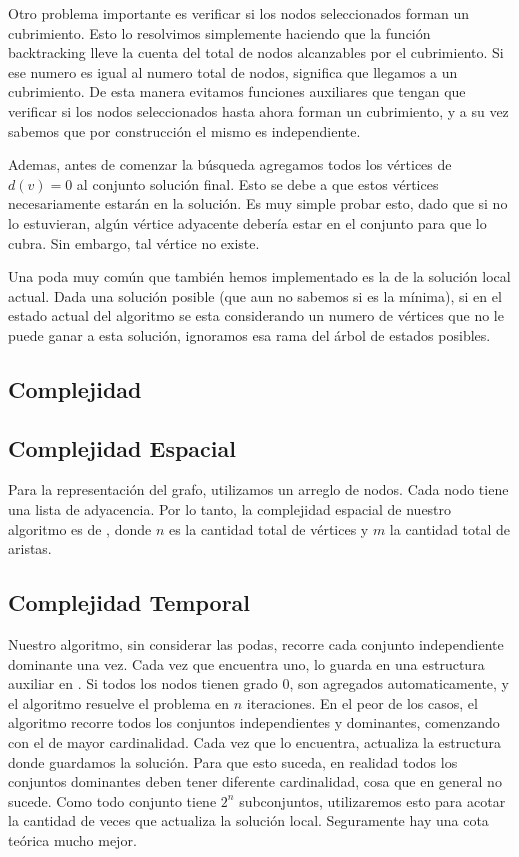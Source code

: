 Otro problema importante es verificar si los nodos seleccionados forman un cubrimiento. Esto lo resolvimos simplemente haciendo que la función backtracking lleve la cuenta del total de nodos alcanzables por el cubrimiento. Si ese numero es igual al numero total de nodos, significa que llegamos a un cubrimiento. De esta manera evitamos funciones auxiliares que tengan que verificar si los nodos seleccionados hasta ahora forman un cubrimiento, y a su vez sabemos que por construcción el mismo es independiente.

Ademas, antes de comenzar la búsqueda agregamos todos los vértices de $d(v) = 0$ al conjunto solución final. Esto se debe a que estos vértices necesariamente estarán en la solución. Es muy simple probar esto, dado que si no lo estuvieran, algún vértice adyacente debería estar en el conjunto para que lo cubra. Sin embargo, tal vértice no existe.

Una poda muy común que también hemos implementado es la de la solución local actual. Dada una solución posible (que aun no sabemos si es la mínima), si en el estado actual del algoritmo se esta considerando un numero de vértices que no le puede ganar a esta solución, ignoramos esa rama del árbol de estados posibles.

\subsection{Complejidad}

\subsection{Complejidad Espacial}
Para la representación del grafo, utilizamos un arreglo de nodos. Cada nodo tiene una lista de adyacencia. Por lo tanto, la complejidad espacial de nuestro algoritmo es de , donde $n$ es la cantidad total de vértices y $m$ la cantidad total de aristas.

\subsection{Complejidad Temporal}
Nuestro algoritmo, sin considerar las podas, recorre cada conjunto independiente dominante una vez. Cada vez que encuentra uno, lo guarda en una estructura auxiliar en . Si todos los nodos tienen grado 0, son agregados automaticamente, y el algoritmo resuelve el problema en $n$ iteraciones.
En el peor de los casos, el algoritmo recorre todos los conjuntos independientes y dominantes, comenzando con el de mayor cardinalidad. Cada vez que lo encuentra, actualiza la estructura donde guardamos la solución. Para que esto suceda, en realidad todos los conjuntos dominantes deben tener diferente cardinalidad, cosa que en general no sucede. Como todo conjunto tiene $2^n$ subconjuntos, utilizaremos esto para acotar la cantidad de veces que actualiza la solución local. Seguramente hay una cota teórica mucho mejor.

